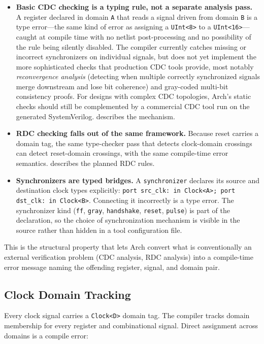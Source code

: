\documentclass[11pt,twocolumn]{article}
\begin{document}
\begin{itemize}
\item \textbf{Basic CDC checking is a typing rule, not a separate analysis pass.} A register declared in domain \texttt{A} that reads a signal driven from domain \texttt{B} is a type error---the same kind of error as assigning a \texttt{UInt<8>} to a \texttt{UInt<16>}---caught at compile time with no netlist post-processing and no possibility of the rule being silently disabled. The compiler currently catches missing or incorrect synchronizers on individual signals, but does not yet implement the more sophisticated checks that production CDC tools provide, most notably \emph{reconvergence analysis} (detecting when multiple correctly synchronized signals merge downstream and lose bit coherence) and gray-coded multi-bit consistency proofs. For designs with complex CDC topologies, Arch's static checks should still be complemented by a commercial CDC tool run on the generated SystemVerilog.  describes the mechanism.
\item \textbf{RDC checking falls out of the same framework.} Because reset carries a domain tag, the same type-checker pass that detects clock-domain crossings can detect reset-domain crossings, with the same compile-time error semantics.  describes the planned RDC rules.
\item \textbf{Synchronizers are typed bridges.} A \texttt{synchronizer} declares its source and destination clock types explicitly: \texttt{port src\_clk: in Clock<A>; port dst\_clk: in Clock<B>}. Connecting it incorrectly is a type error. The synchronizer kind (\texttt{ff}, \texttt{gray}, \texttt{handshake}, \texttt{reset}, \texttt{pulse}) is part of the declaration, so the choice of synchronization mechanism is visible in the source rather than hidden in a tool configuration file.
\end{itemize}

This is the structural property that lets Arch convert what is conventionally an external verification problem (CDC analysis, RDC analysis) into a compile-time error message naming the offending register, signal, and domain pair.

\subsection{Clock Domain Tracking}
\label{sec:cdc}

Every clock signal carries a \texttt{Clock<D>} domain tag. The compiler tracks domain membership for every register and combinational signal. Direct assignment across domains is a compile error:
\end{document}

